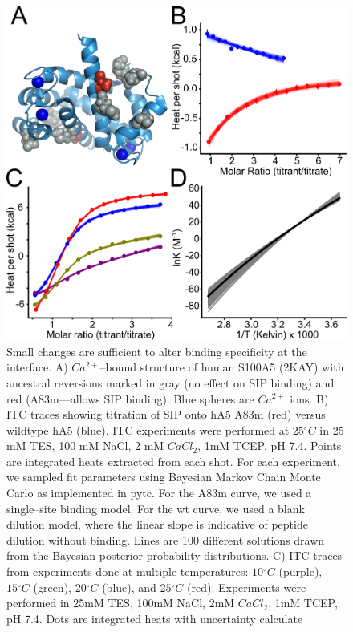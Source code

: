\begin{figure}
\centering
	\includegraphics{ch5-fig5.png} 
\caption[Small changes are sufficient to alter binding specificity]{Small changes are sufficient to alter binding specificity
at the interface. A) $Ca^{2+}$--bound structure of human S100A5 (2KAY)
\citep{bertini_solution_2009} with ancestral reversions marked in
gray (no effect on SIP binding) and red (A83m---allows SIP binding).
Blue spheres are $Ca^{2+}$ ions. B) ITC traces showing titration
of SIP onto hA5 A83m (red) versus wildtype hA5 (blue). ITC experiments
were performed at $25{^\circ}C$ in 25 mM TES, 100 mM NaCl, 2 mM $CaCl_{2}$,
1mM TCEP, pH 7.4. Points are integrated heats extracted from each
shot. For each experiment, we sampled fit parameters using Bayesian
Markov Chain Monte Carlo as implemented in pytc. For the A83m curve,
we used a single--site binding model. For the wt curve, we used a blank
dilution model, where the linear slope is indicative of peptide dilution
without binding. Lines are 100 different solutions drawn from the
Bayesian posterior probability distributions.\textbf{ }C) ITC traces
from experiments done at multiple temperatures: $10{^\circ}C$ (purple),
$15{^\circ}C$ (green), $20{^\circ}C$ (blue), and $25{^\circ}C$
(red). Experiments were performed in 25mM TES, 100mM NaCl, 2mM $CaCl_{2}$,
1mM TCEP, pH 7.4. Dots are integrated heats with uncertainty calculate
}
\end{figure}
